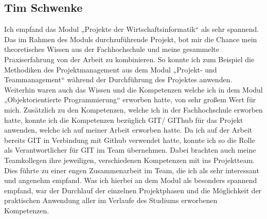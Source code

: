 \subsection{Tim Schwenke}
Ich empfand das Modul „Projekte der Wirtschaftsinformatik“ als sehr spannend. Das im Rahmen des Moduls durchzuführende Projekt, bot mir die Chance mein theoretisches Wissen aus der Fachhochschule und meine gesammelte Praxiserfahrung von der Arbeit zu kombinieren. So konnte ich zum Beispiel die Methodiken des Projektmanagement aus dem Modul „Projekt- und Teammanagement“ während der Durchführung des Projektes anwenden. Weiterhin waren auch das Wissen und die Kompetenzen welche ich in dem Modul „Objektorientierte Programmierung“ erworben hatte, von sehr großem Wert für mich. Zusätzlich zu den Kompetenzen, welche ich in der Fachhochschule erworben hatte, konnte ich die Kompetenzen bezüglich GIT/ GIThub für das Projekt anwenden, welche ich auf meiner Arbeit erworben hatte. Da ich auf der Arbeit bereits GIT in Verbindung mit Github verwendet hatte, konnte ich so die Rolle als Verantwortlicher für GIT im Team übernehmen. Dabei brachten auch meine Teamkollegen ihre jeweiligen, verschiedenen Kompetenzen mit ins Projektteam. Dies führte zu einer engen Zusammenarbeit im Team, die ich als sehr interessant und angenehm empfand. Was ich hierbei an dem Modul als besonders spannend empfand, war der Durchlauf der einzelnen Projektphasen und die Möglichkeit der praktischen Anwendung aller im Verlaufe des Studiums erworbenen Kompetenzen.
